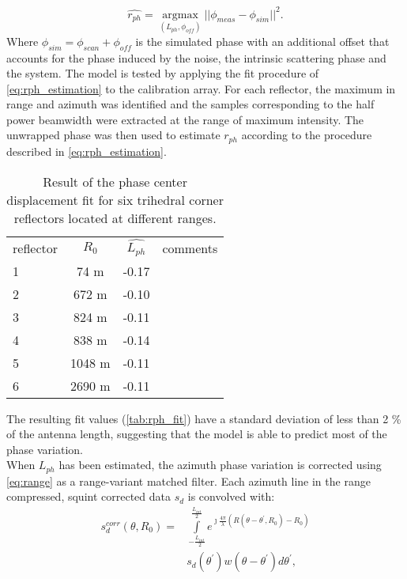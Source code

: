 \begin{equation}\label{eq:rph_estimation}
	\hat{r_{ph}} = \underset{\left(L_{ph}, \phi_{off}\right)}{\operatorname{argmax}}{\vert\vert\phi_{meas} - \phi_{sim}\vert\vert}^2.
\end{equation}
Where $\phi_{sim} = \phi_{scan} + \phi_{off}$ is the simulated phase with an additional offset that accounts for the phase induced by the noise, the intrinsic scattering phase and the system.
The model is tested by applying the fit procedure of \autoref{eq:rph_estimation} to the calibration array. For each reflector, the maximum in range and azimuth was identified and the samples corresponding to the half power beamwidth were extracted at the range of maximum intensity. The unwrapped phase was then used to estimate $r_{ph}$ according to the procedure described in \autoref{eq:rph_estimation}.
\begin{table}[ht]
	\centering
	\begin{tabular}{lccl}
		\hline
		reflector & $R_0$ & $\hat{L_{ph}}$ & comments\\
		1	& 74 m & -0.17 & \\
		2  & 672 m & -0.10 & \\
		3 & 824 m & -0.11 & \\
		4 & 838 m & -0.14 &\\
		5 & 1048 m & -0.11&\\
		6 & 2690 m & -0.11&\\
		\hline
	\end{tabular}
	\caption{Result of the phase center displacement fit for six trihedral corner reflectors located at different ranges.}
	\label{tab:rph_fit}
\end{table}
The resulting fit values (\autoref{tab:rph_fit}) have a standard deviation of less than 2 \% of the antenna length, suggesting that the model is able to predict  most of the phase variation.\\
When $L_{ph}$ has been estimated, the azimuth phase variation is corrected using \autoref{eq:range} as a range-variant matched filter. Each azimuth line in the range compressed, squint corrected data $s_{d}$ is convolved with:
\begin{equation}\label{eq:correction}
	\begin{aligned}
		s_{d}^{corr}\left(\theta, R_{0}\right) = &\int\limits_{-\frac{L_{int}}{2}}^{\frac{L_{int}}{2}}e^{\jmath \frac{4\pi}{\lambda}\left(R\left(\theta - \theta^{\prime}, R_{0}\right) - R_{0}\right)}\\
		&s_{d}\left(\theta^\prime\right)w(\theta - \theta^{\prime}) d\theta^\prime,
	\end{aligned}
\end{equation}
